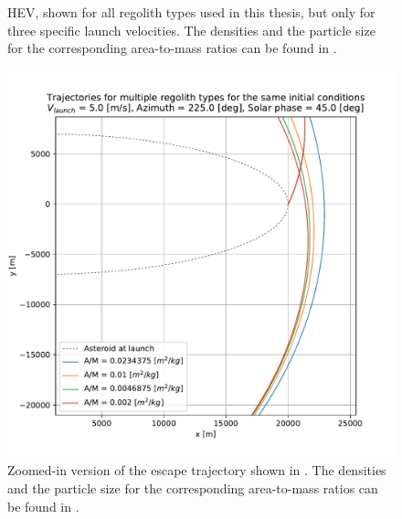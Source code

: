 \documentclass[print]{tudelft-report}
\begin{document}
\begin{appendices}
\begin{figure}[htb]
    \caption{\gls{HEV}, shown for all regolith types used in this thesis, but only for three specific launch velocities. The densities and the particle size for the corresponding area-to-mass ratios can be found in .}
    \label{fig:longestEdge_allParticles_escape_hev_solarPhase315}
    \end{figure}
    \FloatBarrier
    \begin{figure}[htb]
    \centering
    \captionsetup{justification=centering}
    \includegraphics[width=\textwidth, height=0.5\textheight, keepaspectratio=true]{Results/Images/longest_edge_perturbations/multiple_regolith_types/escape_traj_5ms_225Azim_45solarPhase_zoomed.pdf}
    \caption{Zoomed-in version of the escape trajectory shown in . The densities and the particle size for the corresponding area-to-mass ratios can be found in .}
    \label{fig:escape_traj_allParticles_5ms_225Azim_45solarPhase_zoomed}
    \end{figure}
    \FloatBarrier

\end{appendices}
\end{document}
